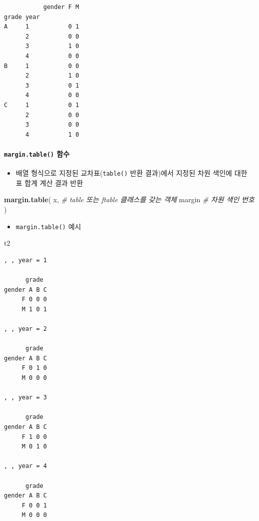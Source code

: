 \documentclass[
  11pt,
]{krantz}
\newenvironment{Shaded}{\begin{snugshade}}{\end{snugshade}}
\newcommand{\CommentTok}[1]{\textcolor[rgb]{0.37,0.37,0.37}{\textit{#1}}}
\newcommand{\KeywordTok}[1]{\textcolor[rgb]{0.27,0.27,0.27}{\textbf{#1}}}
\newcommand{\NormalTok}[1]{#1}
\providecommand{\tightlist}{%
  \setlength{\itemsep}{0pt}\setlength{\parskip}{0pt}}
\begin{document}
\begin{verbatim}
           gender F M
grade year           
A     1           0 1
      2           0 0
      3           1 0
      4           0 0
B     1           0 0
      2           1 0
      3           0 1
      4           0 0
C     1           0 1
      2           0 0
      3           0 0
      4           1 0
\end{verbatim}

\normalsize

\hypertarget{table-fun4}{%
\paragraph{\texorpdfstring{\texttt{margin.table()} 함수}{margin.table() 함수}}\label{table-fun4}}

\begin{itemize}
\tightlist
\item
  배열 형식으로 지정된 교차표(\texttt{table()} 반환 결과)에서 지정된 차원 색인에 대한 표 합계 계산 결과 반환
\end{itemize}

\footnotesize

\begin{Shaded}
\begin{Highlighting}[]
\KeywordTok{margin.table}\NormalTok{(}
\NormalTok{  x,  }\CommentTok{# table 또는 ftable 클래스를 갖는 객체}
\NormalTok{  margin }\CommentTok{# 차원 색인 번호}
\NormalTok{)}
\end{Highlighting}
\end{Shaded}

\normalsize

\begin{itemize}
\tightlist
\item
  \texttt{margin.table()} 예시
\end{itemize}

\footnotesize

\begin{Shaded}
\begin{Highlighting}[]
\NormalTok{t2}
\end{Highlighting}
\end{Shaded}

\begin{verbatim}
, , year = 1

      grade
gender A B C
     F 0 0 0
     M 1 0 1

, , year = 2

      grade
gender A B C
     F 0 1 0
     M 0 0 0

, , year = 3

      grade
gender A B C
     F 1 0 0
     M 0 1 0

, , year = 4

      grade
gender A B C
     F 0 0 1
     M 0 0 0
\end{verbatim}
\end{document}
